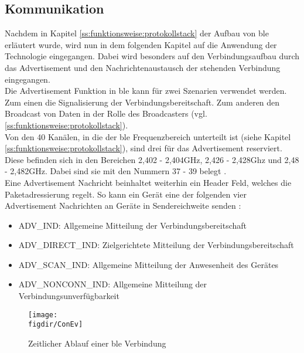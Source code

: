 \subsection{Kommunikation}
\label{ss:funktionsweise:kommunkation}

\noindent Nachdem in Kapitel \ref{ss:funktionsweise:protokollstack} der Aufbau von \ac{ble} erläutert wurde, wird nun in dem folgenden Kapitel auf die Anwendung der Technologie eingegangen. Dabei wird besonders auf den Verbindungsaufbau durch das Advertisement und den Nachrichtenaustausch der stehenden Verbindung eingegangen.\\

\noindent Die Advertisement Funktion in \ac{ble} kann für zwei Szenarien verwendet werden. Zum einen die Signalisierung der Verbindungsbereitschaft. Zum anderen den Broadcast von Daten in der Rolle des Broadcasters (vgl. \ref{ss:funktionsweise:protokollstack}).\\

\noindent Von den 40 Kanälen, in die der \ac{ble} Frequenzbereich unterteilt ist (siehe Kapitel \ref{ss:funktionsweise:protokollstack}), sind drei für das Advertisement reserviert. Diese befinden sich in den Bereichen 2,402 - 2,404GHz, 2,426 - 2,428Ghz und 2,48 - 2,482GHz. Dabei sind sie mit den Nummern 37 - 39 belegt \cite[Seite 16]{Townsend14:GSB}.\\

\noindent Eine Advertisement Nachricht beinhaltet weiterhin ein Header Feld, welches die Paketadressierung regelt. So kann ein Gerät eine der folgenden vier Advertisement Nachrichten an Geräte in Sendereichweite senden \cite[Seite 22]{Townsend14:GSB}:
\begin{itemize}
	\item{ADV\_IND: Allgemeine Mitteilung der Verbindungsbereitschaft}
	\item{ADV\_DIRECT\_IND: Zielgerichtete Mitteilung der Verbindungsbereitschaft}
	\item{ADV\_SCAN\_IND: Allgemeine Mitteilung der Anwesenheit des Gerätes}
	\item{ADV\_NONCONN\_IND: Allgemeine Mitteilung der Verbindungsunverfügbarkeit}
\end{itemize} 

\begin{figure}[!b]
	\centering
	\texttt{[image: \\figdir/ConEv]}
	\caption{Zeitlicher Ablauf einer \ac{ble} Verbindung \cite[Seite 22]{Townsend14:GSB}}
	\label{FIG:ConEv}
\end{figure}

